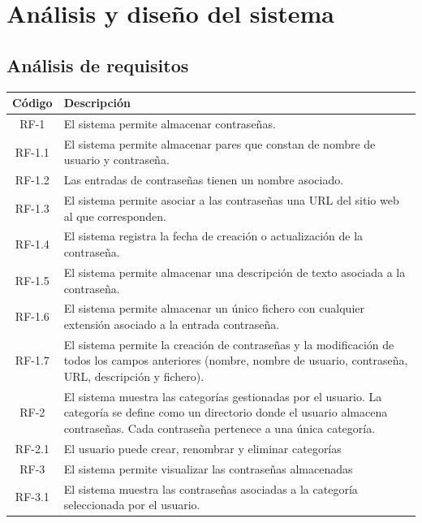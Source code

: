 \documentclass{article}
\begin{document}
\pagebreak

\section{Análisis y diseño del sistema}
 
\subsection{Análisis de requisitos}
 
\begin{table}[H]
   \centering
   \begin{tabular}{| c | p{30em} |}
   \hline
       Código &  Descripción  \\ \hline
       RF-1 & El sistema permite almacenar contraseñas. \\ \hline
       RF-1.1 & El sistema permite almacenar pares que constan de nombre de usuario y contraseña.  \\ \hline
       RF-1.2 & Las entradas de contraseñas tienen un nombre asociado. \\ \hline
       RF-1.3 & El sistema permite asociar a las contraseñas una URL del sitio web al que corresponden. \\ \hline
       RF-1.4 & El sistema registra la fecha de creación o actualización de la contraseña. \\ \hline
       RF-1.5 & El sistema permite almacenar una descripción de texto asociada a la contraseña. \\ \hline
       RF-1.6 & El sistema permite almacenar un único fichero con cualquier extensión asociado a la entrada contraseña. \\ \hline
       RF-1.7 & El sistema permite la creación de contraseñas y la modificación de todos los campos anteriores (nombre, nombre de usuario, contraseña, URL, descripción y fichero). \\ \hline
       RF-2 & El sistema muestra las categorías gestionadas por el usuario. La categoría se define como un directorio donde el usuario almacena contraseñas. Cada contraseña pertenece a una única categoría.\\ \hline
       RF-2.1 & El usuario puede crear, renombrar y eliminar categorías \\ \hline
       RF-3 & El sistema permite visualizar las contraseñas almacenadas\\ \hline
       RF-3.1 & El sistema muestra las contraseñas asociadas a la categoría seleccionada por el usuario. \\ \hline

\end{tabular}
\end{table}
\end{document}
